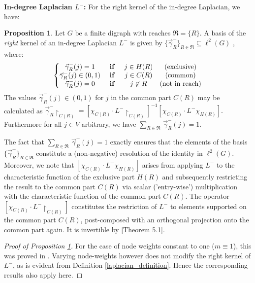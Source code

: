 \documentclass[reqno,12pt,letterpaper]{amsart}
\numberwithin{equation}{section}
\newcommand{\logif}{\text{ \textbf{if} }}
\newcommand{\Lin}{L^{-}}
\newcommand{\1}{\mathds{1}}
\theoremstyle{definition}
\newtheorem{Prop}[Th]{Proposition}
\begin{document}
\noindent \textbf{In-degree Laplacian $\Lin$:} For the right kernel of the in-degree Laplacian, we have:
\begin{Prop}\label{right_kernel_Lin}\cite{Veerman2020APO}
	Let $G$ be a finite digraph with reaches $ \mathfrak{R} = \{R\}$. 
	A basis of the  \emph{right} kernel of an in-degree Laplacian $\Lin$ is given by 
	 $\{\vec \gamma^{-}_{R}\}_{R \in \mathfrak{R}} \subseteq  \ell^2(G)$ , where:
	\begin{align}
		\left\{\begin{matrix}
			\vec	\gamma^{-}_{R}(j)  =1 & \logif & j\in H(R) &\textrm{(exclusive)}\\
			\vec	\gamma^{-}_{R}(j) \in (0,1) & \logif & j\in C(R) &\textrm{(common)}\\
			\vec	\gamma^{-}_{R}(j)=0 & \logif & j\not\in R &\textrm{(not in reach)}\\
		\end{matrix} \right.
	\end{align}
The values $\vec	\gamma^{-}_{R}(j) \in (0,1) $ for $j$ in the common part $C(R)$ may be calculated as 
$
		\vec{\gamma}^{-}_{R}{\restriction_{C(R)}} =   [\chi_{C(R)}\cdot\Lin{\restriction_{C(R)}} ]^{-1} [\chi_{C(R)}\cdot\Lin\chi_{H(R)}].
		$
Furthermore for all $j \in V$ arbitrary, we have $\sum_{R \in \mathfrak{R}}\,	\vec\gamma^{-}_{R}(j) = 1$. 
	\end{Prop}
The fact that $\sum_{R \in \mathfrak{R}}\,	\vec\gamma^{-}_{R}(j) = 1$  exactly ensures that the elements of the basis $\{\vec \gamma^{-}_{R}\}_{R \in \mathfrak{R}}$ constitute a (non-negative) resolution of the identity in $\ell^2(G)$.  Moreover, we note that $[\chi_{C(R)}\cdot\Lin\chi_{H(R)}]$ arises from applying $\Lin$ to the characteristic function of the exclusive part $H(R)$ and subsequently restricting the result to the common part $C(R)$ via  scalar ('entry-wise') multiplication with the characteristic function of the common part $C(R)$. The operator $[\chi_{C(R)}\cdot\Lin{\restriction_{C(R)}} ]$ constitutes the restriction of $\Lin$ to elements supported on the common part $C(R)$, post-composed with an orthogonal projection onto the common part again. It is invertible by \cite{Veerman2020APO}[Theorem 5.1].
\begin{proof}[Proof of Proposition \ref{right_kernel_Lin}]
For the case of node weights constant to one ($m \equiv 1$), this was proved in \cite[Theorem 5.1]{Veerman2020APO}. Varying node-weights however does not modify the right kernel of $\Lin$, as is evident from Definition \ref{laplacian_definition}. Hence the corresponding results also apply here.
	\end{proof}
	
\end{document}
